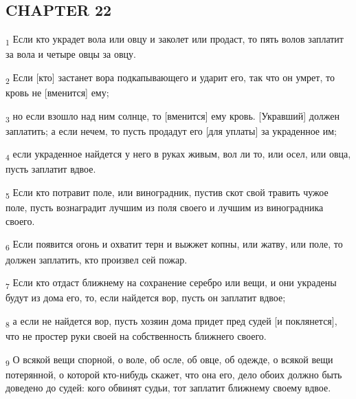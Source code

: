 \subsection{CHAPTER 22}
\begin{tcolorbox}
\textsubscript{1} Если кто украдет вола или овцу и заколет или продаст, то пять волов заплатит за вола и четыре овцы за овцу.
\end{tcolorbox}
\begin{tcolorbox}
\textsubscript{2} Если [кто] застанет вора подкапывающего и ударит его, так что он умрет, то кровь не [вменится] ему;
\end{tcolorbox}
\begin{tcolorbox}
\textsubscript{3} но если взошло над ним солнце, то [вменится] ему кровь. [Укравший] должен заплатить; а если нечем, то пусть продадут его [для уплаты] за украденное им;
\end{tcolorbox}
\begin{tcolorbox}
\textsubscript{4} если украденное найдется у него в руках живым, вол ли то, или осел, или овца, пусть заплатит вдвое.
\end{tcolorbox}
\begin{tcolorbox}
\textsubscript{5} Если кто потравит поле, или виноградник, пустив скот свой травить чужое поле, пусть вознаградит лучшим из поля своего и лучшим из виноградника своего.
\end{tcolorbox}
\begin{tcolorbox}
\textsubscript{6} Если появится огонь и охватит терн и выжжет копны, или жатву, или поле, то должен заплатить, кто произвел сей пожар.
\end{tcolorbox}
\begin{tcolorbox}
\textsubscript{7} Если кто отдаст ближнему на сохранение серебро или вещи, и они украдены будут из дома его, то, если найдется вор, пусть он заплатит вдвое;
\end{tcolorbox}
\begin{tcolorbox}
\textsubscript{8} а если не найдется вор, пусть хозяин дома придет пред судей [и поклянется], что не простер руки своей на собственность ближнего своего.
\end{tcolorbox}
\begin{tcolorbox}
\textsubscript{9} О всякой вещи спорной, о воле, об осле, об овце, об одежде, о всякой вещи потерянной, о которой кто-нибудь скажет, что она его, дело обоих должно быть доведено до судей: кого обвинят судьи, тот заплатит ближнему своему вдвое.
\end{tcolorbox}
